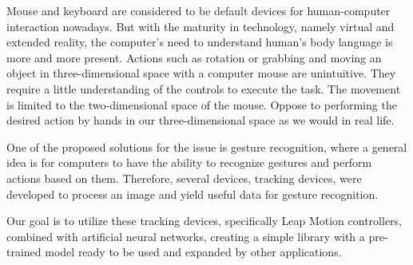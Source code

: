 Mouse and keyboard are considered to be default devices for human-computer interaction nowadays. But with the maturity in technology, namely virtual and extended reality, the computer's need to understand human's body language is more and more present. Actions such as rotation or grabbing and moving an object in three-dimensional space with a computer mouse are unintuitive. They require a little understanding of the controls to execute the task. The movement is limited to the two-dimensional space of the mouse. Oppose to performing the desired action by hands in our three-dimensional space as we would in real life.

One of the proposed solutions for the issue is gesture recognition, where a general idea is for computers to have the ability to recognize gestures and perform actions based on them. Therefore, several devices, tracking devices, were developed to process an image and yield useful data for gesture recognition.

Our goal is to utilize these tracking devices, specifically Leap Motion controllers, combined with artificial neural networks, creating a simple library with a pre-trained model ready to be used and expanded by other applications.